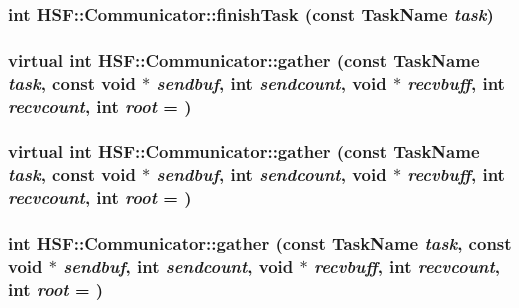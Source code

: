 \label{classHSF_1_1Communicator_afd2efabdf9dc5461641311337c36b12f}
\hypertarget{classHSF_1_1Communicator_a1773f5d7c1f6c6bc83e53a48deba5510}{
\subsubsection[{finishTask}]{\setlength{\rightskip}{0pt plus 5cm}int HSF::Communicator::finishTask (const {\bf TaskName} {\em task})}}
\label{classHSF_1_1Communicator_a1773f5d7c1f6c6bc83e53a48deba5510}
\hypertarget{classHSF_1_1Communicator_ae4b80c741ad3afd2d0a7ec72c6f16624}{
\subsubsection[{gather}]{\setlength{\rightskip}{0pt plus 5cm}virtual int HSF::Communicator::gather (const {\bf TaskName} {\em task}, \/  const void $\ast$ {\em sendbuf}, \/  int {\em sendcount}, \/  void $\ast$ {\em recvbuff}, \/  int {\em recvcount}, \/  int {\em root} = {})}}
\label{classHSF_1_1Communicator_ae4b80c741ad3afd2d0a7ec72c6f16624}
\hypertarget{classHSF_1_1Communicator_ae4b80c741ad3afd2d0a7ec72c6f16624}{
\subsubsection[{gather}]{\setlength{\rightskip}{0pt plus 5cm}virtual int HSF::Communicator::gather (const {\bf TaskName} {\em task}, \/  const void $\ast$ {\em sendbuf}, \/  int {\em sendcount}, \/  void $\ast$ {\em recvbuff}, \/  int {\em recvcount}, \/  int {\em root} = {})}}
\label{classHSF_1_1Communicator_ae4b80c741ad3afd2d0a7ec72c6f16624}
\hypertarget{classHSF_1_1Communicator_a27fd4507bb56bef2605e6f8d52fa5fb3}{
\subsubsection[{gather}]{\setlength{\rightskip}{0pt plus 5cm}int HSF::Communicator::gather (const {\bf TaskName} {\em task}, \/  const void $\ast$ {\em sendbuf}, \/  int {\em sendcount}, \/  void $\ast$ {\em recvbuff}, \/  int {\em recvcount}, \/  int {\em root} = {})}}
